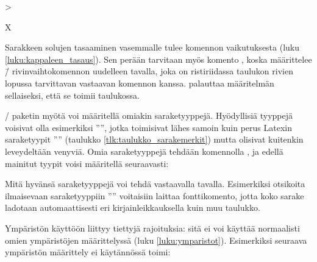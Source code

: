 \begin{koodilohkosis}
>{\raggedright\arraybackslash}X
\end{koodilohkosis}

Sarakkeen solujen tasaaminen vasemmalle tulee komennon
 vaikutuksesta (luku \ref{luku:kappaleen_tasaus}).
Sen perään tarvitaan myös komento , koska
 määrittelee \komento{\keno}\=/ rivinvaihtokomennon
uudelleen tavalla, joka on ristiriidassa taulukon rivien lopussa
tarvittavan vastaavan komennon kanssa. 
palauttaa määritelmän sellaiseksi, että se toimii taulukossa.

\-/ paketin myötä voi määritellä omiakin
saraketyyppejä. Hyödyllisiä tyyppejä voisivat olla esimerkiksi
'''', jotka toimisivat lähes samoin kuin perus Latexin
saraketyypit '''' (taulukko \ref{tlk:taulukko_sarakemerkit})
mutta olisivat kuitenkin leveydeltään venyviä. Omia saraketyyppejä
tehdään komennolla , ja edellä mainitut tyypit
voisi määritellä seuraavasti:

\begin{koodilohkosis}
\end{koodilohkosis}

Mitä hyvänsä saraketyyppejä voi tehdä vastaavalla tavalla. Esimerkiksi
otsikoita ilmaisevaan saraketyyppiin '''' voitaisiin laittaa
fonttikomento, jotta koko sarake ladotaan automaattisesti eri
kirjainleikkauksella kuin muu taulukko.

\begin{koodilohkosis}
\end{koodilohkosis}

Ympäristön  käyttöön liittyy tiettyjä rajoituksia:
sitä ei voi käyttää normaalisti omien ympäristöjen määrittelyssä (luku
\ref{luku:ymparistot}). Esimerkiksi seuraava ympäristön määrittely ei
käytännössä toimi:

\begin{koodilohkosis}
\newenvironment{omataulukko}[1]
{\begin{tabularx}{\linewidth}{#1}}
{\end{tabularx}}
\end{koodilohkosis}

